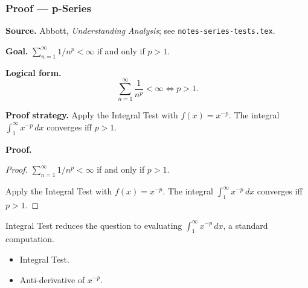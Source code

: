 
\clearpage
{}
\hypertarget{proof-RA-ABB-T-p-series}{}

\subsubsection[p-Series]{Proof --- p-Series}

\bigskip

\noindent
\textbf{Source.} Abbott, \emph{Understanding Analysis}; see \texttt{notes-series-tests.tex}.

\vspace{0.75em}

\noindent
\textbf{Goal.} $\sum_{n=1}^\infty 1/n^p < \infty$ if and only if $p > 1$.

\vspace{0.75em}

\noindent
\textbf{Logical form.}
\[
  \sum_{n=1}^\infty \frac{1}{n^p} < \infty \Longleftrightarrow p > 1.
\]

\vspace{0.75em}

\noindent
\textbf{Proof strategy.} Apply the Integral Test with $f(x) = x^{-p}$. The integral $\int_1^\infty x^{-p}\,dx$ converges iff $p > 1$.

\vspace{0.75em}

\noindent
\textbf{Proof.}
\begin{proof}
\Claim $\sum_{n=1}^\infty 1/n^p < \infty$ if and only if $p > 1$.

\Given 

\Goal 

\Strategy Apply the Integral Test with $f(x) = x^{-p}$. The integral $\int_1^\infty x^{-p}\,dx$ converges iff $p > 1$.

\medskip


\end{proof}

\begin{remark*}
Integral Test reduces the question to evaluating $\int_1^\infty x^{-p}\,dx$, a standard computation.
\end{remark*}

\begin{remark*}[Dependencies]
\begin{itemize}
  \item Integral Test.
  \item Anti-derivative of $x^{-p}$.
\end{itemize}
\end{remark*}
